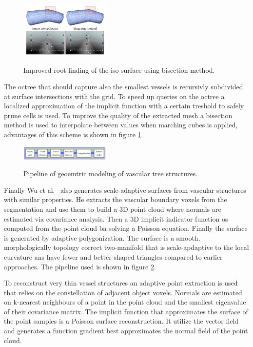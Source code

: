 \begin{figure}[h]
	\centering
	\includegraphics[width=0.4\textwidth]{./Images/BisectionMethod.png} \\
	\caption{Improved root-finding of the iso-surface using bisection method.}
	\cite{kretschmer2012reliable}
	\label{fig:BisectionMethod}
\end{figure} 

The octree that should capture also the smallest vessels is recursivly subdivided at surface intersections with the grid. To speed up queries on the octree a localized approximation of the implicit function with a certain treshold to safely prune cells is used.
To improve the quality of the extracted mesh a bisection method is used to interpolate between values when marching cubes is applied, advantages of this scheme is shown in figure \ref{fig:BisectionMethod}.

\begin{figure}[h]
	\centering
	\includegraphics[width=0.4\textwidth]{./Images/Pipeline.png} \\
	\caption{Pipeline of geoemtric modeling of vascular tree structures.}
	\cite{wu2010scale}
	\label{fig:Pipeline}
\end{figure} 

Finally Wu et al.~\cite{wu2010scale} also generates scale-adaptive surfaces from vascular structures with similar properties. He extracts the vascular boundary voxels from the segmentation and use them to build a 3D point cloud where normals are estimated via covariance analysis. Then a 3D implicit indicator function os computed from the point cloud ba solving a Poisson equation. Finally the surface is generated by adaptive polygonization.
The surface is a smooth, morphologically topology correct two-manifold that is scale-apdaptive to the local curvature ans have fewer and better shaped triangles compared to earlier approaches. The pipeline used is shown in figure \ref{fig:Pipeline}. 

To reconstruct very thin vessel structures an adaptive point extraction is used that relies on the constellation of adjacent object voxels. Normals are estimated on k-nearest neighbours of a point in the point cloud and the smallest eigenvalue of their covariance matrix. The implicit function that approximates the surface of the point samples is a Poisson surface reconstruction. It utilize the vector field and generates a function gradient best approximates the normal field of the point cloud.

